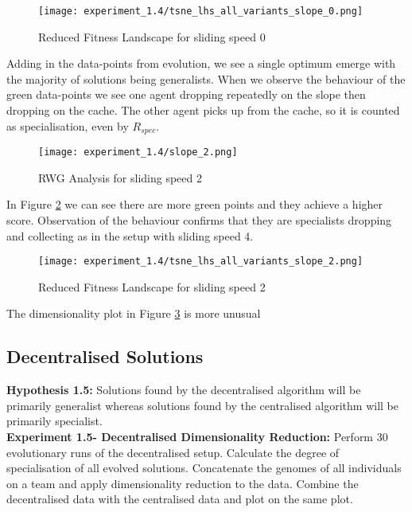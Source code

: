 \documentclass[12pt]{article}
\begin{document}
\begin{figure}[h]
\centering
\texttt{[image: experiment\_1.4/tsne\_lhs\_all\_variants\_slope\_0.png]}
\caption{Reduced Fitness Landscape for sliding speed 0}
\label{fig:tsne_slope_0}
\end{figure}

Adding in the data-points from evolution, we see a single optimum emerge with the majority of solutions being generalists.
When we observe the behaviour of the green data-points we see one agent dropping repeatedly on the slope then dropping on the cache.
The other agent picks up from the cache, so it is counted as specialisation, even by $R_{spec}$.\\

\begin{figure}[h]
\centering
\texttt{[image: experiment\_1.4/slope\_2.png]}
\caption{RWG Analysis for sliding speed 2}
\label{fig:slope_2_rwg}
\end{figure}

In Figure \ref{fig:slope_2_rwg} we can see there are more green points and they achieve a higher score.
Observation of the behaviour confirms that they are specialists dropping and collecting as in the setup with sliding speed 4.

\begin{figure}[h]
\centering
\texttt{[image: experiment\_1.4/tsne\_lhs\_all\_variants\_slope\_2.png]}
\caption{Reduced Fitness Landscape for sliding speed 2}
\label{fig:tsne_slope_2}
\end{figure}

The dimensionality plot in Figure \ref{fig:tsne_slope_2} is more unusual

\subsection{Decentralised Solutions} 

\textbf{Hypothesis 1.5:} Solutions found by the decentralised algorithm will be primarily generalist whereas solutions found by the centralised algorithm will be primarily specialist.\\

\textbf{Experiment 1.5- Decentralised Dimensionality Reduction:} Perform 30 evolutionary runs of the decentralised setup.
Calculate the degree of specialisation of all evolved solutions.
Concatenate the genomes of all individuals on a team and apply dimensionality reduction to the data.
Combine the decentralised data with the centralised data and plot on the same plot.\\
\end{document}
